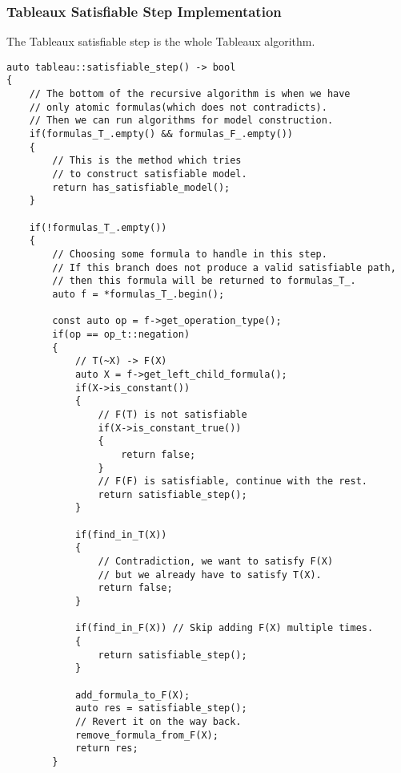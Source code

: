 \documentclass{article}
\begin{document}
	\subsubsection*{Tableaux Satisfiable Step Implementation}
	The Tableaux satisfiable step is the whole Tableaux algorithm.
\begin{lstlisting}
auto tableau::satisfiable_step() -> bool
{
    // The bottom of the recursive algorithm is when we have
    // only atomic formulas(which does not contradicts).
    // Then we can run algorithms for model construction.
    if(formulas_T_.empty() && formulas_F_.empty())
    {
        // This is the method which tries
        // to construct satisfiable model.
        return has_satisfiable_model();
    }

    if(!formulas_T_.empty())
    {
        // Choosing some formula to handle in this step.
        // If this branch does not produce a valid satisfiable path,
        // then this formula will be returned to formulas_T_.
        auto f = *formulas_T_.begin();

        const auto op = f->get_operation_type();
        if(op == op_t::negation)
        {
            // T(~X) -> F(X)
            auto X = f->get_left_child_formula();
            if(X->is_constant())
            {
                // F(T) is not satisfiable
                if(X->is_constant_true())
                {
                    return false;
                }
                // F(F) is satisfiable, continue with the rest.
                return satisfiable_step();
            }

            if(find_in_T(X))
            {
                // Contradiction, we want to satisfy F(X)
                // but we already have to satisfy T(X).
                return false;
            }

            if(find_in_F(X)) // Skip adding F(X) multiple times.
            {
                return satisfiable_step();
            }

            add_formula_to_F(X);
            auto res = satisfiable_step();
            // Revert it on the way back.
            remove_formula_from_F(X);
            return res;
        }
\end{lstlisting}
\newpage
\end{document}
